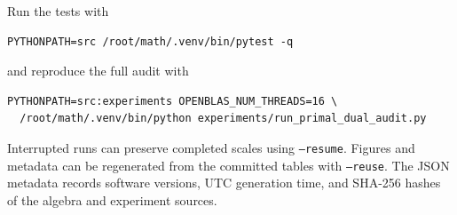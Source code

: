 \documentclass[11pt]{article}
\theoremstyle{definition}
\theoremstyle{remark}
\begin{document}
Run the tests with
\begin{verbatim}
PYTHONPATH=src /root/math/.venv/bin/pytest -q
\end{verbatim}
and reproduce the full audit with
\begin{verbatim}
PYTHONPATH=src:experiments OPENBLAS_NUM_THREADS=16 \
  /root/math/.venv/bin/python experiments/run_primal_dual_audit.py
\end{verbatim}
Interrupted runs can preserve completed scales using \texttt{--resume}.
Figures and metadata can be regenerated from the committed tables with
\texttt{--reuse}.  The JSON metadata records software versions, UTC
generation time, and SHA-256 hashes of the algebra and experiment sources.



\end{document}
